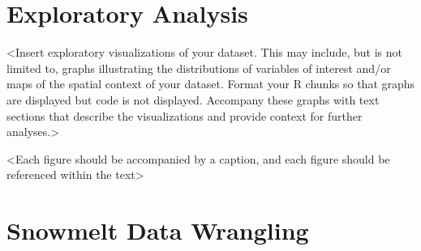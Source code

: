 \documentclass[12pt,]{article}
\begin{document}
\newpage

\hypertarget{exploratory-analysis}{%
\section{Exploratory Analysis}\label{exploratory-analysis}}

\textless{}Insert exploratory visualizations of your dataset. This may
include, but is not limited to, graphs illustrating the distributions of
variables of interest and/or maps of the spatial context of your
dataset. Format your R chunks so that graphs are displayed but code is
not displayed. Accompany these graphs with text sections that describe
the visualizations and provide context for further
analyses.\textgreater{}

\textless{}Each figure should be accompanied by a caption, and each
figure should be referenced within the text\textgreater{}

\hypertarget{snowmelt-data-wrangling}{%
\section{Snowmelt Data Wrangling}\label{snowmelt-data-wrangling}}
\end{document}
